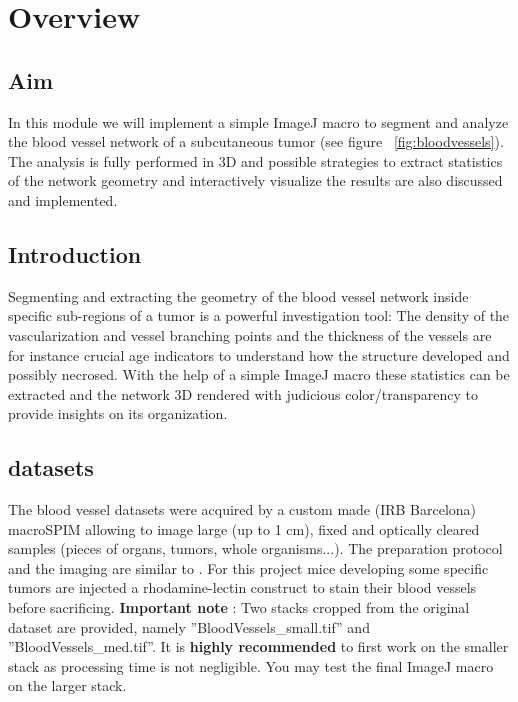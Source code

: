 \section{Overview}

\subsection{Aim}
In this module we will implement a simple ImageJ macro to segment and analyze the blood vessel network of a subcutaneous tumor (see figure ~\ref{fig:bloodvessels}). The analysis is fully performed in 3D and possible strategies to extract statistics of the network geometry and interactively visualize the results are also discussed and implemented.

\subsection{Introduction}
\label{sec:mod8lab0}

Segmenting and extracting the geometry of the blood vessel network inside specific sub-regions of a tumor is a powerful investigation tool: The density of the vascularization and vessel branching points and the thickness of the vessels are for instance crucial age indicators to understand how the structure developed and possibly necrosed. With the help of a simple ImageJ macro these statistics can be extracted and the network 3D rendered with judicious color/transparency to provide insights on its organization. 

\subsection{datasets}
The blood vessel datasets were acquired by a custom made (IRB Barcelona) macroSPIM allowing to image large (up to 1 cm), fixed and optically cleared samples (pieces of organs, tumors, whole organisms...). The preparation protocol and the imaging are similar to \cite{jahrling20093d}. For this project mice developing some specific tumors are injected a rhodamine-lectin construct to stain their blood vessels before sacrificing.
\textbf{Important note} : Two stacks cropped from the original dataset are provided, namely ''BloodVessels\_small.tif'' and ''BloodVessels\_med.tif''. It is \textbf{highly recommended} to first work on the smaller stack as processing time is not negligible. You may test the final ImageJ macro on the larger stack.